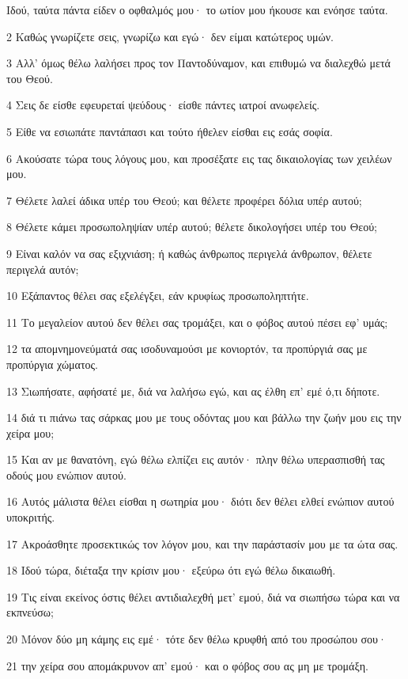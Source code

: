 \par Ιδού, ταύτα πάντα είδεν ο οφθαλμός μου· το ωτίον μου ήκουσε και ενόησε ταύτα.
\par 2 Καθώς γνωρίζετε σεις, γνωρίζω και εγώ· δεν είμαι κατώτερος υμών.
\par 3 Αλλ' όμως θέλω λαλήσει προς τον Παντοδύναμον, και επιθυμώ να διαλεχθώ μετά του Θεού.
\par 4 Σεις δε είσθε εφευρεταί ψεύδους· είσθε πάντες ιατροί ανωφελείς.
\par 5 Είθε να εσιωπάτε παντάπασι και τούτο ήθελεν είσθαι εις εσάς σοφία.
\par 6 Ακούσατε τώρα τους λόγους μου, και προσέξατε εις τας δικαιολογίας των χειλέων μου.
\par 7 Θέλετε λαλεί άδικα υπέρ του Θεού; και θέλετε προφέρει δόλια υπέρ αυτού;
\par 8 Θέλετε κάμει προσωποληψίαν υπέρ αυτού; θέλετε δικολογήσει υπέρ του Θεού;
\par 9 Είναι καλόν να σας εξιχνιάση; ή καθώς άνθρωπος περιγελά άνθρωπον, θέλετε περιγελά αυτόν;
\par 10 Εξάπαντος θέλει σας εξελέγξει, εάν κρυφίως προσωποληπτήτε.
\par 11 Το μεγαλείον αυτού δεν θέλει σας τρομάξει, και ο φόβος αυτού πέσει εφ' υμάς;
\par 12 τα απομνημονεύματά σας ισοδυναμούσι με κονιορτόν, τα προπύργιά σας με προπύργια χώματος.
\par 13 Σιωπήσατε, αφήσατέ με, διά να λαλήσω εγώ, και ας έλθη επ' εμέ ό,τι δήποτε.
\par 14 διά τι πιάνω τας σάρκας μου με τους οδόντας μου και βάλλω την ζωήν μου εις την χείρα μου;
\par 15 Και αν με θανατόνη, εγώ θέλω ελπίζει εις αυτόν· πλην θέλω υπερασπισθή τας οδούς μου ενώπιον αυτού.
\par 16 Αυτός μάλιστα θέλει είσθαι η σωτηρία μου· διότι δεν θέλει ελθεί ενώπιον αυτού υποκριτής.
\par 17 Ακροάσθητε προσεκτικώς τον λόγον μου, και την παράστασίν μου με τα ώτα σας.
\par 18 Ιδού τώρα, διέταξα την κρίσιν μου· εξεύρω ότι εγώ θέλω δικαιωθή.
\par 19 Τις είναι εκείνος όστις θέλει αντιδιαλεχθή μετ' εμού, διά να σιωπήσω τώρα και να εκπνεύσω;
\par 20 Μόνον δύο μη κάμης εις εμέ· τότε δεν θέλω κρυφθή από του προσώπου σου·
\par 21 την χείρα σου απομάκρυνον απ' εμού· και ο φόβος σου ας μη με τρομάξη.
